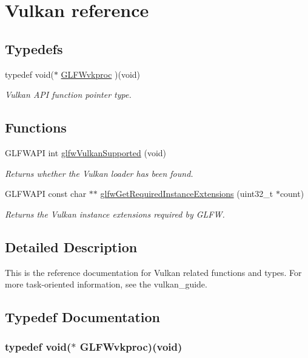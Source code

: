 \hypertarget{group__vulkan}{
\section{Vulkan reference}
\label{group__vulkan}
}
\subsection*{Typedefs}
\begin{CompactItemize}
\item 
typedef void($\ast$ \hyperlink{group__vulkan_g4d98d00a0ef73bcfd6cc46f261955975}{GLFWvkproc} )(void)
\begin{CompactList}\small\item\em Vulkan API function pointer type. \item\end{CompactList}\end{CompactItemize}
\subsection*{Functions}
\begin{CompactItemize}
\item 
GLFWAPI int \hyperlink{group__vulkan_g72e7c3757d9ff2333181a5569bb7c403}{glfwVulkanSupported} (void)
\begin{CompactList}\small\item\em Returns whether the Vulkan loader has been found. \item\end{CompactList}\item 
GLFWAPI const char $\ast$$\ast$ \hyperlink{group__vulkan_g70adaf0cfc99adc484c49ea99e17c2cf}{glfwGetRequiredInstanceExtensions} (uint32\_\-t $\ast$count)
\begin{CompactList}\small\item\em Returns the Vulkan instance extensions required by GLFW. \item\end{CompactList}\end{CompactItemize}


\subsection{Detailed Description}
This is the reference documentation for Vulkan related functions and types. For more task-oriented information, see the vulkan\_\-guide. 

\subsection{Typedef Documentation}
\hypertarget{group__vulkan_g4d98d00a0ef73bcfd6cc46f261955975}{
\subsubsection[GLFWvkproc]{\setlength{\rightskip}{0pt plus 5cm}typedef void($\ast$ {\bf GLFWvkproc})(void)}}
\label{group__vulkan_g4d98d00a0ef73bcfd6cc46f261955975}


